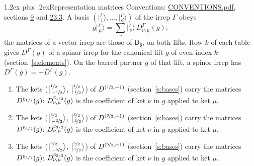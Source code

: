 \documentclass[10pt,a4paper]{article}
\makeatletter
\renewcommand\section{\@startsection{section}{1}{\z@}{-3ex plus -1ex minus -.2ex}%
  {1.2ex plus .2ex}{\normalfont\large\sffamily\bfseries\color{parttitle}}}
\numberwithin{equation}{section}
\newcommand{\grp}[1]{\mathsf{#1}}
\newcommand{\irr}[1]{\text{\normalfont\scshape #1}}
\newcommand{\irrJp}[2]{D^{(#1,#2)}}
\newcommand{\repD}[1]{D^{#1}}
\newcommand{\intx}{\mu}
\newcommand{\jm}[2]{\bigl\lvert{}^{#1}_{\,#2}\bigr\rangle}
\newcommand{\irket}[2]{\bigl\lvert{}^{#1}_{\,#2}\bigr\rangle}
\newcommand{\barred}[1]{\bar{#1}}
\newenvironment{romanlist}{\begin{enumerate}%
\renewcommand{\labelenumi}{(\roman{enumi})}}%
  {\end{enumerate}}
\makeatother
\begin{document}
\section{Representation matrices}\label{s:irrep_matrices}
Conventions: \href{../../CONVENTIONS.pdf}{CONVENTIONS.pdf}, sections \href{../../../rotation/CONVENTIONS.pdf\#conv.9}{9} and \href{../../CONVENTIONS.pdf\#conv.23.3}{23.3}.
\leavevmode\label{n:vector.ket.partner}\label{n:index.partner}\label{n:matrix.irrep}\label{n:index.partner.summed}A basis $(\irket{\Gamma}{1}, \dots, \irket{\Gamma}{d})$ of the irrep $\Gamma$ obeys
\begin{equation}\label{e:partner}g\irket{\Gamma}{\intx} = \sum_\nu \irket{\Gamma}{\nu}\, \repD{\Gamma}_{\nu,\intx}(g);\end{equation}
the matrices of a vector irrep are those of \href{../../../rotation/data/pdf/D6.pdf}{$\grp{D_{6}}$}, on both lifts. Row $k$ of each table gives $\repD{\Gamma}(g)$ of a spinor irrep for the canonical lift $g$ of even index $k$ (section~\ref{s:elements}). On the barred partner $\barred{g}$ of that lift, a spinor irrep has $\repD{\Gamma}(\barred{g}) = -\repD{\Gamma}(g)$.
\begin{romanlist}\raggedright
\item The kets ($\jm{\nicefrac{1}{2}}{-\nicefrac{1}{2}}$, $\jm{\nicefrac{1}{2}}{\nicefrac{1}{2}}$) of $\irrJp{\nicefrac{1}{2}}{+1}$ (section~\ref{s:bases}) carry the matrices $\repD{\irr{e}_{1/2}}(g)$: $\repD{\irr{e}_{1/2}}_{\nu,\intx}(g)$ is the coefficient of ket $\nu$ in $g$ applied to ket $\intx$.
\item The kets ($\jm{\nicefrac{3}{2}}{-\nicefrac{3}{2}}$, $\jm{\nicefrac{3}{2}}{\nicefrac{3}{2}}$) of $\irrJp{\nicefrac{3}{2}}{+1}$ (section~\ref{s:bases}) carry the matrices $\repD{\irr{e}_{3/2}}(g)$: $\repD{\irr{e}_{3/2}}_{\nu,\intx}(g)$ is the coefficient of ket $\nu$ in $g$ applied to ket $\intx$.
\item The kets ($\jm{\nicefrac{5}{2}}{-\nicefrac{5}{2}}$, $\jm{\nicefrac{5}{2}}{\nicefrac{5}{2}}$) of $\irrJp{\nicefrac{5}{2}}{+1}$ (section~\ref{s:bases}) carry the matrices $\repD{\irr{e}_{5/2}}(g)$: $\repD{\irr{e}_{5/2}}_{\nu,\intx}(g)$ is the coefficient of ket $\nu$ in $g$ applied to ket $\intx$.
\end{romanlist}
\end{document}

